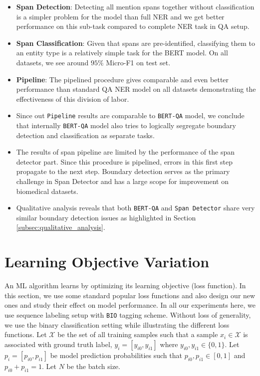 \begin{itemize}
    \item \textbf{Span Detection}: Detecting all mention spans together without classification is a simpler problem for the model than full NER and we get better performance on this sub-task compared to complete NER task in QA setup.
    
    \item \textbf{Span Classification}: Given that spans are pre-identified, classifying them to an entity type is a relatively simple task for the BERT model. On all datasets, we see around $95\%$ Micro-F1 on test set.
    
    \item \textbf{Pipeline}: The pipelined procedure gives comparable and even better performance than standard QA NER model on all datasets demonstrating the effectiveness of this division of labor. 
    
    \item Since out \texttt{Pipeline} results are comparable to \texttt{BERT-QA} model, we conclude that internally \texttt{BERT-QA} model also tries to logically segregate boundary detection and classification as separate tasks.
    
    \item The results of span pipeline are limited by the performance of the span detector part. Since this procedure is pipelined, errors in this first step propagate to the next step. Boundary detection serves as the primary challenge in Span Detector and has a large scope for improvement on biomedical datasets.
    
    \item Qualitative analysis reveals that both \texttt{BERT-QA} and \texttt{Span Detector} share very similar boundary detection issues as highlighted in Section \ref{subsec:qualitative_analysis}.
\end{itemize}

\section{Learning Objective Variation}
An ML algorithm learns by optimizing its learning objective (loss function). In this section, we use some standard popular loss functions and also design our new ones and study their effect on model performance. In all our experiments here, we use sequence labeling setup with \texttt{BIO} tagging scheme. Without loss of generality, we use the binary classification setting while illustrating the different loss functions. Let $\mathcal{X}$ be the set of all training samples such that a sample $x_i \in \mathcal{X}$ is associated with ground truth label, $y_i = [y_{i0}, y_{i1}]$ where $y_{i0}, y_{i1} \in \{0, 1\}$. Let $p_i = [p_{i0}, p_{i1}]$ be model prediction probabilities such that $p_{i0}, p_{i1} \in [0, 1]$ and $p_{i0} + p_{i1} = 1$. Let $N$ be the batch size.

